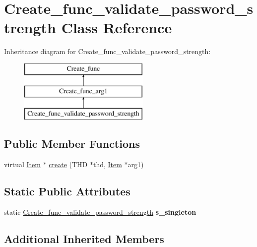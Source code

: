 \hypertarget{classCreate__func__validate__password__strength}{}\section{Create\+\_\+func\+\_\+validate\+\_\+password\+\_\+strength Class Reference}
\label{classCreate__func__validate__password__strength}
Inheritance diagram for Create\+\_\+func\+\_\+validate\+\_\+password\+\_\+strength\+:\begin{figure}[H]
\begin{center}
\leavevmode
\includegraphics[height=3.000000cm]{classCreate__func__validate__password__strength}
\end{center}
\end{figure}
\subsection*{Public Member Functions}
\begin{DoxyCompactItemize}
\item 
virtual \mbox{\hyperlink{classItem}{Item}} $\ast$ \mbox{\hyperlink{classCreate__func__validate__password__strength_a6d40eb95bb5d943da9a140cb119b0966}{create}} (T\+HD $\ast$thd, \mbox{\hyperlink{classItem}{Item}} $\ast$arg1)
\end{DoxyCompactItemize}
\subsection*{Static Public Attributes}
\begin{DoxyCompactItemize}
\item 
\mbox{\label{classCreate__func__validate__password__strength_ac50ae808e4544057d7ab72a6c9d27f1e}} 
static \mbox{\hyperlink{classCreate__func__validate__password__strength}{Create\+\_\+func\+\_\+validate\+\_\+password\+\_\+strength}} {\bfseries s\+\_\+singleton}
\end{DoxyCompactItemize}
\subsection*{Additional Inherited Members}


